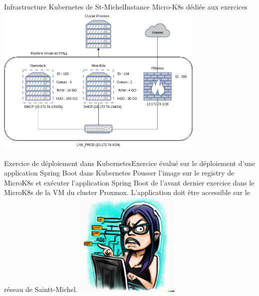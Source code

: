 \documentclass{beamer}
\begin{document}
    \begin{frame}{Infrastructure Kubernetes de St-Michel}{Instance Micro-K8s dédiée aux exercices}
        \bigbreak
        \centering
        \includegraphics[width=10cm]{image/infra.drawio}
    \end{frame}

    \begin{frame}{Exercice \execcounterdispinc{} de déploiement dans Kubernetes}{Exercice évalué sur le déploiement d'une application Spring Boot dans Kubernetes}
        Pousser l'image sur le registry de MicroK8s et exécuter l'application Spring Boot  de l'avant dernier exercice dans le MicroK8s de la VM du cluster Proxmox.
        \bigbreak
        L'application doit être accessible sur le réseau de Saintt-Michel.
        \bigbreak
        \centering
        \includegraphics[width=5cm]{image/maniac-programmer-sorting-her-code}
    \end{frame}
\end{document}

